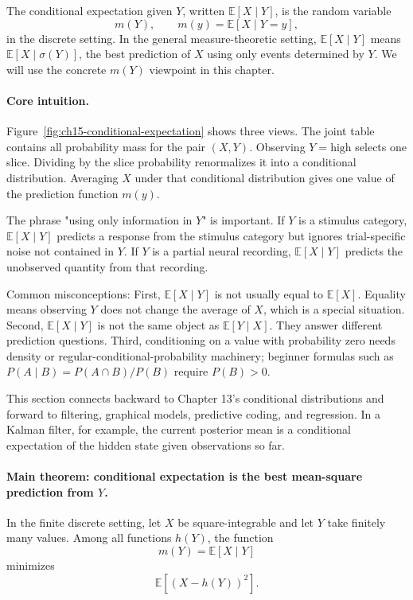 The conditional expectation given \(Y\), written \(\mathbb{E}[X\mid Y]\), is the random variable
\[
m(Y),\qquad m(y)=\mathbb{E}[X\mid Y=y],
\]
in the discrete setting. In the general measure-theoretic setting, \(\mathbb{E}[X\mid Y]\) means \(\mathbb{E}[X\mid \sigma(Y)]\), the best prediction of \(X\) using only events determined by \(Y\). We will use the concrete \(m(Y)\) viewpoint in this chapter.

\paragraph{Core intuition.}
Figure~\ref{fig:ch15-conditional-expectation} shows three views. The joint table contains all probability mass for the pair \((X,Y)\). Observing \(Y=\mathrm{high}\) selects one slice. Dividing by the slice probability renormalizes it into a conditional distribution. Averaging \(X\) under that conditional distribution gives one value of the prediction function \(m(y)\).

The phrase "using only information in \(Y\)" is important. If \(Y\) is a stimulus category, \(\mathbb{E}[X\mid Y]\) predicts a response from the stimulus category but ignores trial-specific noise not contained in \(Y\). If \(Y\) is a partial neural recording, \(\mathbb{E}[X\mid Y]\) predicts the unobserved quantity from that recording.

Common misconceptions: First, \(\mathbb{E}[X\mid Y]\) is not usually equal to \(\mathbb{E}[X]\). Equality means observing \(Y\) does not change the average of \(X\), which is a special situation. Second, \(\mathbb{E}[X\mid Y]\) is not the same object as \(\mathbb{E}[Y\mid X]\). They answer different prediction questions. Third, conditioning on a value with probability zero needs density or regular-conditional-probability machinery; beginner formulas such as \(P(A\mid B)=P(A\cap B)/P(B)\) require \(P(B)>0\).

This section connects backward to Chapter 13's conditional distributions and forward to filtering, graphical models, predictive coding, and regression. In a Kalman filter, for example, the current posterior mean is a conditional expectation of the hidden state given observations so far.

\paragraph{Main theorem: conditional expectation is the best mean-square prediction from \(Y\).}
In the finite discrete setting, let \(X\) be square-integrable and let \(Y\) take finitely many values. Among all functions \(h(Y)\), the function
\[
m(Y)=\mathbb{E}[X\mid Y]
\]
minimizes
\[
\mathbb{E}\!\left[(X-h(Y))^2\right].
\]

